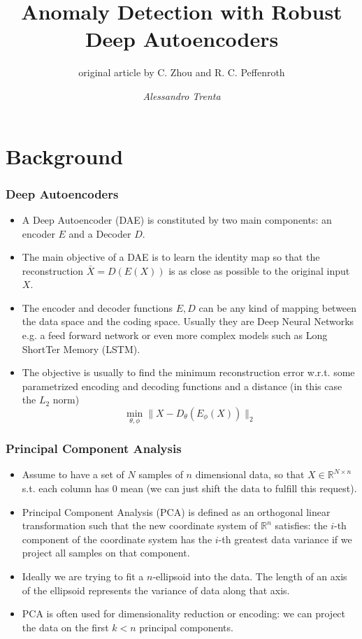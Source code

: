 \documentclass{beamer}
\title[Anomaly Detection with Robust Deep Autoencoders]{Anomaly Detection with Robust Deep Autoencoders} %
\subtitle[]{original article by C. Zhou and R. C. Peffenroth}
\author[Alessandro Trenta]{\emph{Alessandro Trenta}} %
\institute[SNS] %
{Scuola Normale Superiore \\ %
}
\date{} %
\theoremstyle{plain}
\theoremstyle{definition}
\theoremstyle{remark}
\newcommand{\R}{\mathbb{R}}
\newcommand{\norm}[1]{\lVert#1\rVert}
\begin{document}
\begin{frame}
	\titlepage %
\end{frame}

\begin{frame}
	\tableofcontents
\end{frame}

\nocite{RAE}

\section{Background}

\begin{frame}
	\frametitle{Deep Autoencoders}
	\begin{itemize}
		\item A Deep Autoencoder (DAE) is constituted by two main components: an encoder $E$ and a Decoder $D$.
		\item The main objective of a DAE is to learn the identity map so that the reconstruction $\bar{X}=D(E(X))$ is as close as possible to the original input $X$.
		\item The encoder and decoder functions $E, D$ can be any kind of mapping between the data space and the coding space. Usually they are Deep Neural Networks e.g. a feed forward network or even more complex models such as Long ShortTer Memory (LSTM).
		\item The objective is usually to find the minimum reconstruction error w.r.t. some parametrized encoding and decoding functions and a distance (in this case the $L_2$ norm)
			\begin{equation}
				\min_{\theta, \phi}{\norm{X-D_{\theta}(E_{\phi}(X))}_{2}}
			\end{equation}
	\end{itemize}
\end{frame}

\begin{frame}
	\frametitle{Principal Component Analysis}
	\begin{itemize}
		\item Assume to have a set of $N$ samples of $n$ dimensional data, so that $X\in \R^{N\times n}$ s.t. each column has $0$ mean (we can just shift the data to fulfill this request).
		\item Principal Component Analysis (PCA) is defined as an orthogonal linear transformation such that the new coordinate system of $\R^{n}$ satisfies: 
			the $i$-th component of the coordinate system has the $i$-th greatest data variance if we project all samples on that component.
		\item Ideally we are trying to fit a $n$-ellipsoid into the data. The length of an axis of the ellipsoid represents the variance of data along that axis.
		\item PCA is often used for dimensionality reduction or encoding: we can project the data on the first $k<n$ principal components.
	\end{itemize}
\end{frame}
\end{document}
